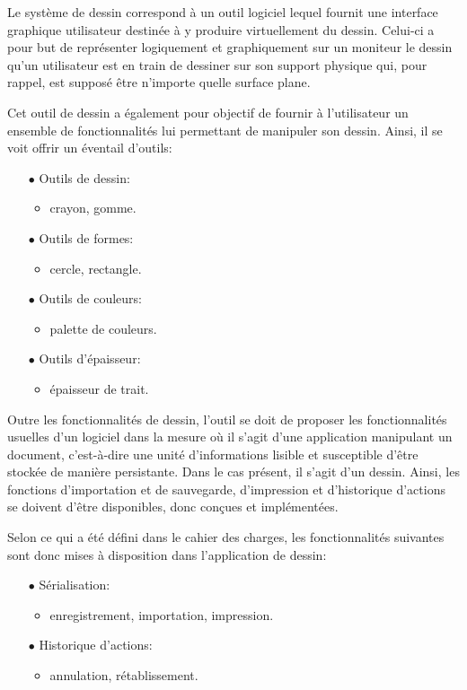 \documentclass[11pt,a4paper,oldfontcommands]{memoir}
\begin{document}
Le système de dessin correspond à un outil logiciel lequel fournit une interface graphique utilisateur destinée à y produire virtuellement du dessin. Celui-ci a pour but de représenter logiquement et graphiquement sur un moniteur le dessin qu'un utilisateur est en train de dessiner sur son support physique qui, pour rappel, est supposé être n'importe quelle surface plane.

Cet outil de dessin a également pour objectif de fournir à l'utilisateur un ensemble de fonctionnalités lui permettant de manipuler son dessin. Ainsi, il se voit offrir un éventail d'outils:

\begin{itemize}
\item[$\bullet$] Outils de dessin:
    \begin{itemize}
    \item crayon, gomme.
    \end{itemize}
\item[$\bullet$] Outils de formes:
    \begin{itemize}
    \item cercle, rectangle.
    \end{itemize}
\item[$\bullet$] Outils de couleurs:
    \begin{itemize}
    \item palette de couleurs.
    \end{itemize}
\item[$\bullet$] Outils d'épaisseur:
    \begin{itemize}
    \item épaisseur de trait.
    \end{itemize}
\end{itemize}

Outre les fonctionnalités de dessin, l'outil se doit de proposer les fonctionnalités usuelles d'un logiciel dans la mesure où il s'agit d'une application manipulant un document, c'est-à-dire une unité d'informations lisible et susceptible d'être stockée de manière persistante. Dans le cas présent, il s'agit d'un dessin. Ainsi, les fonctions d'importation et de sauvegarde, d'impression et d'historique d'actions se doivent d'être disponibles, donc conçues et implémentées.

Selon ce qui a été défini dans le cahier des charges, les fonctionnalités suivantes sont donc mises à disposition dans l'application de dessin:

\begin{itemize}
\item[$\bullet$] Sérialisation:
    \begin{itemize}
    \item enregistrement, importation, impression.
    \end{itemize}
\item[$\bullet$] Historique d'actions:
    \begin{itemize}
    \item annulation, rétablissement.
    \end{itemize}
\end{itemize}
\end{document}
